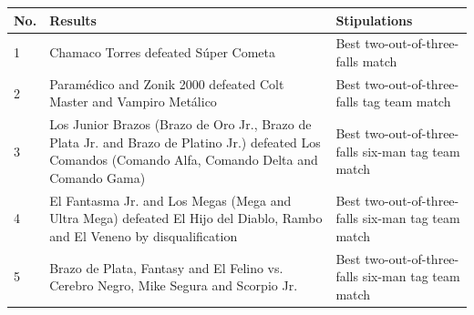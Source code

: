 \documentclass{article}
\begin{document}
\begin{tabular}{lll}
\toprule
No. & Results & Stipulations \\
\midrule
1 & Chamaco Torres defeated Súper Cometa & Best two-out-of-three-falls match \\
2 & Paramédico and Zonik 2000 defeated Colt Master and Vampiro Metálico & Best two-out-of-three-falls tag team match \\
3 & Los Junior Brazos (Brazo de Oro Jr., Brazo de Plata Jr. and Brazo de Platino Jr.) defeated Los Comandos (Comando Alfa, Comando Delta and Comando Gama) & Best two-out-of-three-falls six-man tag team match \\
4 & El Fantasma Jr. and Los Megas (Mega and Ultra Mega) defeated El Hijo del Diablo, Rambo and El Veneno by disqualification & Best two-out-of-three-falls six-man tag team match \\
5 & Brazo de Plata, Fantasy and El Felino vs. Cerebro Negro, Mike Segura and Scorpio Jr. & Best two-out-of-three-falls six-man tag team match \\
\bottomrule
\end{tabular}
\end{document}
